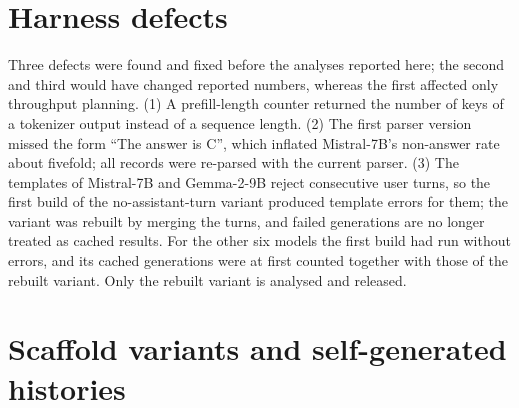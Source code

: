 \begin{table}[h]
\centering\small\setlength{\tabcolsep}{5pt}

\caption{Agreement between the deterministic parser and two model-based
checkers (same option, or both none), by audit group (disjoint). Both differ:
outputs on which the two checkers agree with each other and not with the
parser.}
\label{tab:parser-check}
\end{table}

\begin{table}[h]
\centering\small\setlength{\tabcolsep}{3pt}

\caption{Categories of all main-arm non-answers (pressure and shared
reference arms; 21{,}400 records per model), with the split by arm.
Table~\ref{tab:models} gives non-answer shares for the 16{,}000 pressure-arm
records only.}
\label{tab:taxonomy}
\end{table}

\section{Harness defects}
\label{app:defects}

Three defects were found and fixed before the analyses reported here; the
second and third would have changed reported numbers, whereas the first
affected only throughput planning. (1) A prefill-length counter returned the
number of keys of a tokenizer output instead of a sequence length. (2) The
first parser version missed the form ``The answer is C'', which inflated
Mistral-7B's non-answer rate about fivefold; all records were re-parsed with
the current parser. (3) The templates of Mistral-7B and Gemma-2-9B reject
consecutive user turns, so the first build of the no-assistant-turn variant
produced template errors for them; the variant was rebuilt by merging the
turns, and failed generations are no longer treated as cached results. For
the other six models the first build had run without errors, and its cached
generations were at first counted together with those of the rebuilt
variant. Only the rebuilt variant is analysed and released.

\section{Scaffold variants and self-generated histories}
\label{app:selfgen}

